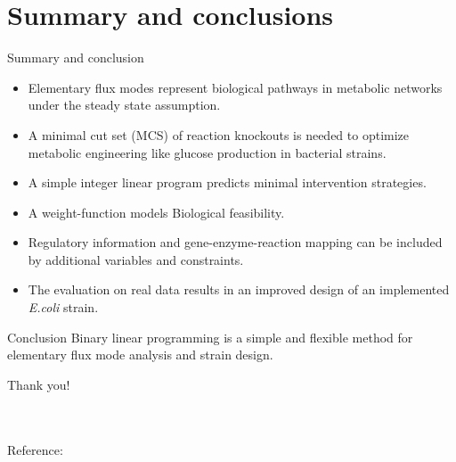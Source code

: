 \documentclass{beamer}
\begin{document}
\section{Summary and conclusions}
\begin{frame}{Summary and conclusion}
\begin{itemize}
    \item Elementary flux modes represent biological pathways 
        in metabolic networks under the steady state assumption.
    \pause
    \item A minimal cut set (MCS) of reaction knockouts is needed to optimize 
    metabolic engineering like glucose production in bacterial strains.
    \pause
    \item A simple integer linear program predicts minimal intervention strategies.
    \pause
    \item A weight-function models Biological feasibility.
    \pause
    \item Regulatory information and gene-enzyme-reaction mapping 
    can be included by additional variables and constraints.
    \pause
    \item The evaluation on real data results in an improved design  
    of an implemented \emph{E.coli} strain.
\end{itemize}	
\pause
\begin{block}{Conclusion}
    Binary linear programming is a simple and flexible method for 
    elementary flux mode analysis and strain design.
\end{block}
\end{frame}

\begin{frame}
\begin{center}    
    \nocite{Jungreuthmayer2012}
    \large Thank you!
\end{center}
 ~ \\
 ~ \\
\normalsize
Reference: \\


\end{frame}
\end{document}
